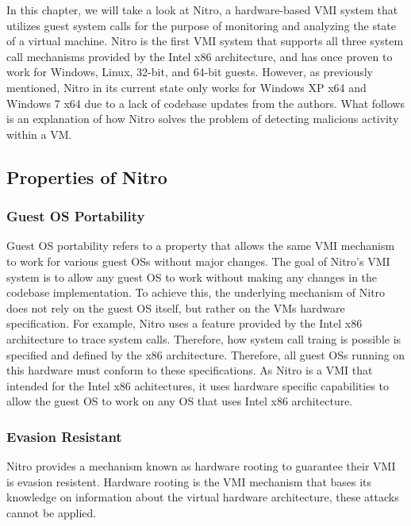 \documentclass{report}
\begin{document}
\begin{spacing}{1.5}
{\large
In this chapter, we will take a look at Nitro, a hardware-based VMI system that utilizes guest system calls for the purpose of monitoring and analyzing the state of a virtual machine. Nitro is the first VMI system that supports all three system call mechanisms provided by the Intel x86 architecture, and has once proven to work for Windows, Linux, 32-bit, and 64-bit guests. However, as previously mentioned, Nitro in its current state only works for Windows XP x64 and Windows 7 x64 due to a lack of codebase updates from the authors. What follows is an explanation of how Nitro solves the problem of detecting malicious activity within a VM.
\newline
}

\subsection{Properties of Nitro}

\subsubsection{Guest OS Portability}
{\large
Guest OS portability refers to a property that allows the same VMI mechanism to work for various guest OSs without major changes.
The goal of Nitro's VMI system is to allow any guest OS to work without making any changes in the codebase implementation. To achieve this, the underlying mechanism of Nitro does not rely on the guest OS itself, but rather on the VMs hardware specification. For example, Nitro uses a feature provided by the Intel x86 architecture to trace system calls. Therefore, how system call traing is possible is specified and defined by the x86 architecture. Therefore, all guest OSs running on this hardware must conform to these specifications. As Nitro is a VMI that intended for the Intel x86 achitectures, it uses hardware specific capabilities to allow the guest OS to work on any OS that uses Intel x86 architecture.
\newline
}

\subsubsection{Evasion Resistant}
{\large
Nitro provides a mechanism known as hardware rooting to guarantee their VMI is evasion resistent. Hardware rooting is the VMI mechanism that bases its knowledge on information about the virtual hardware architecture, these attacks cannot be applied.

}
\end{spacing}
\end{document}
